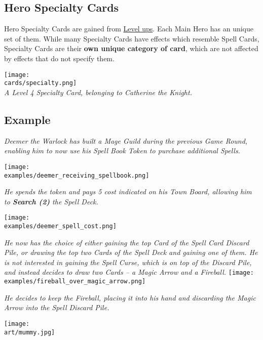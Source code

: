 \begin{multicols*}{2}
\subsection*{\hypertarget{Specialty}{Hero Specialty Cards}}

Hero Specialty Cards are gained from \hyperlink{Level}{Level ups}.
Each Main Hero has an unique set of them.
While many Specialty Cards have effects which resemble Spell Cards, Specialty Cards are their \textbf{own unique category of card}, which are not affected by effects that do not specify them.

\begin{center}
  \texttt{[image: \\cards/specialty.png]}\\
  \medskip
  \scriptsize\textit{A Level 4 Specialty Card, belonging to Catherine the Knight.}
\end{center}

\subsection*{Example}

\textit{Deemer the Warlock has built a Mage Guild during the previous Game Round, enabling him to now use his Spell Book Token to purchase additional Spells.}\par
\texttt{[image: \\examples/deemer\_receiving\_spellbook.png]}\par
\textit{He spends the token and pays 5  cost indicated on his Town Board, allowing him to \textbf{Search (2)} the Spell Deck.}\par
\texttt{[image: \\examples/deemer\_spell\_cost.png]}\par
\textit{He now has the choice of either gaining the top Card of the Spell Card Discard Pile, or drawing the top two Cards of the Spell Deck and gaining one of them.
He is not interested in gaining the Spell Curse, which is on top of the Discard Pile, and instead decides to draw two Cards – a Magic Arrow and a Fireball.}
\texttt{[image: \\examples/fireball\_over\_magic\_arrow.png]}\par
\textit{He decides to keep the Fireball, placing it into his hand and discarding the Magic Arrow into the Spell Discard Pile.}

\texttt{[image: \\art/mummy.jpg]}
\end{multicols*}
